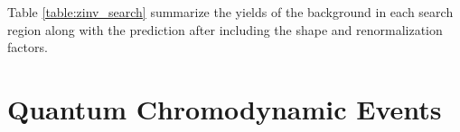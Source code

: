 
Table \ref{table:zinv_search} summarize the yields of the \Znunu{} background in each search region along with the prediction after including the shape and renormalization factors. 




\section{Quantum Chromodynamic Events}
\label{subsec:QCD}

